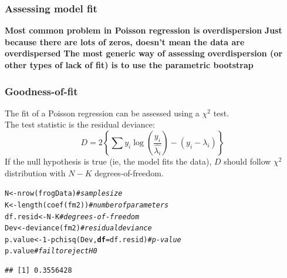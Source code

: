 \documentclass[color=usenames,dvipsnames]{beamer}\usepackage[]{graphicx}\usepackage[]{color}
\makeatletter
\newcommand{\hlnum}[1]{\textcolor[rgb]{0.69,0.494,0}{#1}}%
\newcommand{\hlcom}[1]{\textcolor[rgb]{0.514,0.506,0.514}{\textit{#1}}}%
\newcommand{\hlopt}[1]{\textcolor[rgb]{0,0,0}{#1}}%
\newcommand{\hlstd}[1]{\textcolor[rgb]{0,0,0}{#1}}%
\newcommand{\hlkwb}[1]{\textcolor[rgb]{0,0.341,0.682}{#1}}%
\newcommand{\hlkwc}[1]{\textcolor[rgb]{0,0,0}{\textbf{#1}}}%
\newcommand{\hlkwd}[1]{\textcolor[rgb]{0.004,0.004,0.506}{#1}}%
\newenvironment{kframe}{%
 \def\at@end@of@kframe{}%
 \ifinner\ifhmode%
  \def\at@end@of@kframe{\end{minipage}}%
  \begin{minipage}{\columnwidth}%
 \fi\fi%
 \def\FrameCommand##1{\hskip\@totalleftmargin \hskip-\fboxsep
 \colorbox{shadecolor}{##1}\hskip-\fboxsep
     \hskip-\linewidth \hskip-\@totalleftmargin \hskip\columnwidth}%
 \MakeFramed {\advance\hsize-\width
   \@totalleftmargin\z@ \linewidth\hsize
   \@setminipage}}%
 {\par\unskip\endMakeFramed%
 \at@end@of@kframe}
\newenvironment{knitrout}{}{} %
\makeatother
\begin{document}
\begin{frame}
  \frametitle{Assessing model fit}
  {\bf Most common problem in Poisson regression is {\alert{overdispersion}}}
  \pause
  \vfill
  {\bf Just because there are lots of zeros, doesn't mean the data are overdispersed}
  \pause
  \vfill
  {\bf The most generic way of assessing overdispersion (or other types of
    lack of fit) is to use the parametric bootstrap}
\end{frame}



\begin{frame}[fragile]
  \frametitle{Goodness-of-fit}
The fit of a Poisson regression can be assessed using a $\chi^2$
test. \\
\pause
\vfill
The test statistic is the residual deviance:
\[
  D = 2 \left\{\sum y_i \log\left(\frac{y_i}{\hat{\lambda_i}}\right) - (y_i-\lambda_i)\right\}
\]
\pause
\vfill
If the null hypothesis is true (ie, the model fits the data), $D$ should
follow $\chi^2$ distribution with $N-K$ degrees-of-freedom.
\pause
\vfill
\begin{knitrout}\footnotesize
{}\color{fgcolor}\begin{kframe}
\begin{alltt}
\hlstd{N} \hlkwb{<-} \hlkwd{nrow}\hlstd{(frogData)}                   \hlcom{# sample size}
\hlstd{K} \hlkwb{<-} \hlkwd{length}\hlstd{(}\hlkwd{coef}\hlstd{(fm2))}                \hlcom{# number of parameters}
\hlstd{df.resid} \hlkwb{<-} \hlstd{N}\hlopt{-}\hlstd{K}                       \hlcom{# degrees-of-freedom}
\hlstd{Dev} \hlkwb{<-} \hlkwd{deviance}\hlstd{(fm2)}                  \hlcom{# residual deviance}
\hlstd{p.value} \hlkwb{<-} \hlnum{1}\hlopt{-}\hlkwd{pchisq}\hlstd{(Dev,} \hlkwc{df}\hlstd{=df.resid)} \hlcom{# p-value}
\hlstd{p.value}                               \hlcom{# fail to reject H0}
\end{alltt}
\begin{verbatim}
## [1] 0.3556428
\end{verbatim}
\end{kframe}
\end{knitrout}
\end{frame}
\end{document}

